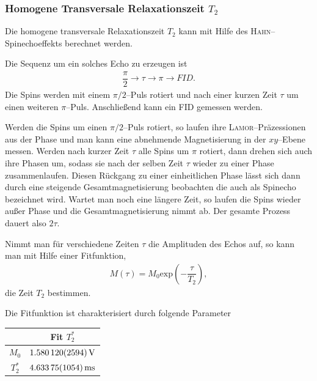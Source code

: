 \documentclass[10pt]{article}
\newenvironment{Figure}
  {\par\medskip\noindent\minipage{\linewidth}}
  {\endminipage\par\medskip}
\begin{document}
\begin{multicols}{2}
\subsubsection{Homogene Transversale Relaxationszeit $T_2$}
Die homogene transversale Relaxationszeit $T_2$ kann mit Hilfe des \textsc{Hahn}--Spinechoeffekts berechnet werden.

Die Sequenz um ein solches Echo zu erzeugen ist
\begin{align} 
        \dfrac{\pi }{2}\rightarrow \tau \rightarrow \pi \rightarrow FID
.\end{align} 
Die Spins werden mit einem $\pi /2$--Puls rotiert und nach einer kurzen Zeit $\tau $ um einen weiteren $\pi $--Puls.
Anschließend kann ein FID gemessen werden.

Werden die Spins um einen $\pi /2$--Puls rotiert, so laufen ihre \textsc{Lamor}--Präzessionen aus der Phase und man kann eine abnehmende Magnetisierung in der $xy$--Ebene messen.
Werden nach kurzer Zeit $\tau $ alle Spins um $\pi $ rotiert, dann drehen sich auch ihre Phasen um, sodass sie nach der selben Zeit $\tau $ wieder zu einer Phase zusammenlaufen.
Diesen Rückgang zu einer einheitlichen Phase lässt sich dann durch eine steigende Gesamtmagnetisierung beobachten die auch als Spinecho bezeichnet wird.
Wartet man noch eine längere Zeit, so laufen die Spins wieder außer Phase und die Gesamtmagnetisierung nimmt ab.
Der gesamte Prozess dauert also $2\tau $.

Nimmt man für verschiedene Zeiten $\tau $ die Amplituden des Echos auf, so kann man mit Hilfe einer Fitfunktion,
\begin{align} 
        M\left(\tau \right)=M_0\text{exp}\left(-\dfrac{\tau }{T_2}\right)
,\end{align} 
die Zeit $T_2$ bestimmen.
  \begin{Figure}
    \centering\resizebox{\textwidth}{!}{}
    \label{fig:T2eff}
  \end{Figure}
Die Fitfunktion ist charakterisiert durch folgende Parameter
  \begin{center}
    \begin{tabular}{c|c}
    & Fit $T_2^*$\\
    \hline
    $M_0$ & $\SI{1.58012+-0.002594}{V}$ \\
    $T_2^*$ & $\SI{4.63375+-0.01054}{ms}$ 
    \end{tabular}
  \label{Tab:PZG_para}
  \end{center}

\end{multicols}
\printbibliography
\end{document}
